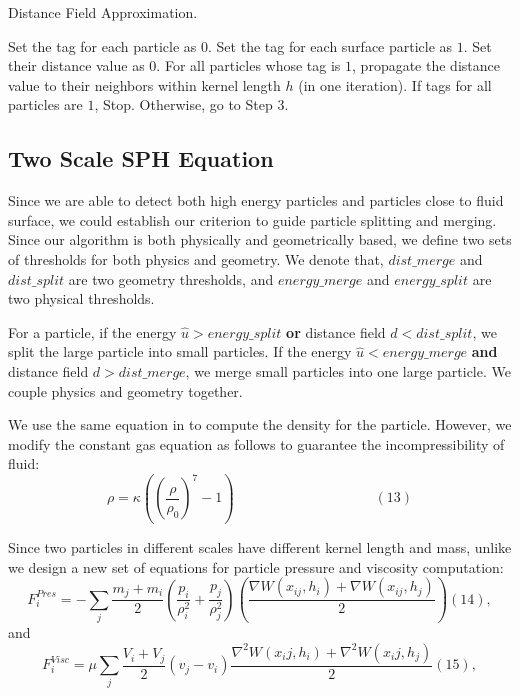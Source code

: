 \begin{algorithm}[htb]
\caption{ Distance Field Approximation. }
\begin{algorithmic}[1]
\STATE Set the tag for each particle as $0$.
\STATE Set the tag for each surface particle as $1$. Set their distance value as $0$.
\STATE For all particles whose tag is $1$, propagate the distance value to their neighbors within kernel length $h$ (in one iteration).
\STATE If tags for all particles are $1$, Stop. Otherwise, go to Step $3$.
\end{algorithmic}
\end{algorithm}

\subsection{Two Scale SPH Equation}

Since we are able to detect both high energy particles and particles
close to fluid surface, we could establish our criterion to guide
particle splitting and merging. Since our algorithm is both physically
and geometrically based, we define two sets of thresholds for both
physics and geometry. We denote that, $dist \_ merge$ and
$dist \_ split$ are two geometry thresholds, and
$energy \_ merge$ and $energy \_ split$ are two physical thresholds.

For a particle, if the energy $\hat{u} > energy \_ split$ \textbf{or}
distance field $d < dist \_ split$, we split the large particle into
small particles.
If the energy $\hat{u} < energy \_ merge$ \textbf{and} distance field $d > dist \_ merge$, we merge small particles into one large particle. We couple physics and geometry together.

We use the same equation in \cite{Muller:2003:PFS:846276.846298}
to compute the density for the particle. However, we
modify the constant gas equation as follows to guarantee
the incompressibility of fluid:
$$\rho=\kappa((\frac{\rho}{\rho_0})^7-1) \quad \quad \quad \quad \quad \quad\quad \quad \quad \quad(13)$$

Since two particles in different scales have different kernel length and
mass, unlike \cite{Adams:2007:ASP:1276377.1276437} we design a new
set of equations for particle pressure and viscosity computation:
$$F^{Pres}_i=-\sum_{j}\frac{m_j+m_i}{2}(\frac{p_i}{\rho_i^2}+\frac{p_j}{\rho_j^2})(\frac{\nabla W(x_{ij}, h_i)+\nabla W(x_{ij}, h_j)}{2}) (14),$$
and
$$F^{Visc}_i=\mu\sum_{j}\frac{V_i+V_j}{2}(v_j-v_i)\frac{\nabla^2W(x_ij, h_i)+\nabla^2W(x_ij, h_j)}{2} (15),$$

